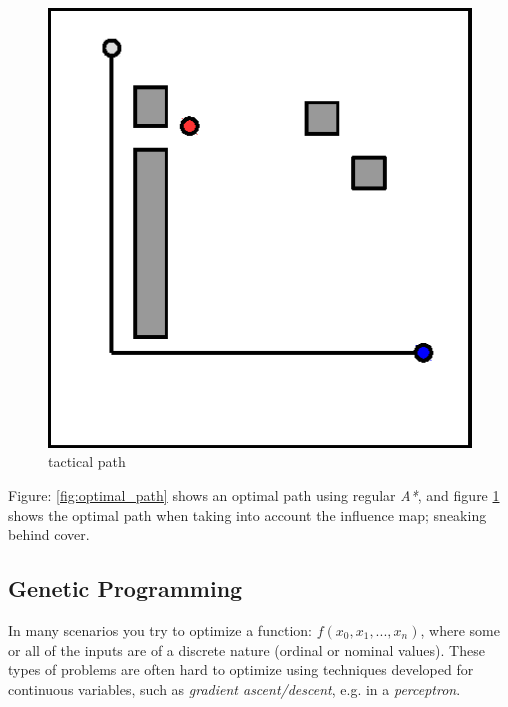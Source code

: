 \documentclass[a4paper, twocolumn]{article}
\begin{document}
\begin{minipage}{\linewidth}
	\begin{minipage}{0.45\linewidth}
	\begin{figure}[H]
        \centering
		\includegraphics[width=\linewidth]{share/good.eps}
		\caption{tactical path}
		\label{fig:smart_path}
	\end{figure}
	\end{minipage}
\end{minipage}

\vspace{0.5em}
     Figure: \cref{fig:optimal_path} shows an optimal path using regular \emph{A*}, and figure \cref{fig:smart_path} shows the optimal path when taking into account the influence map; sneaking behind cover.
	
	\subsection{Genetic Programming} \label{sec:genetic_programming}

    In many scenarios you try to optimize a function: \(f(x_0,x_1,...,x_n)\), where some or all of the inputs are of a discrete nature (ordinal or nominal values). These types of problems are often hard to optimize using techniques developed for continuous variables, such as \emph{gradient ascent/descent}, e.g. in a \emph{perceptron}.
\end{document}
